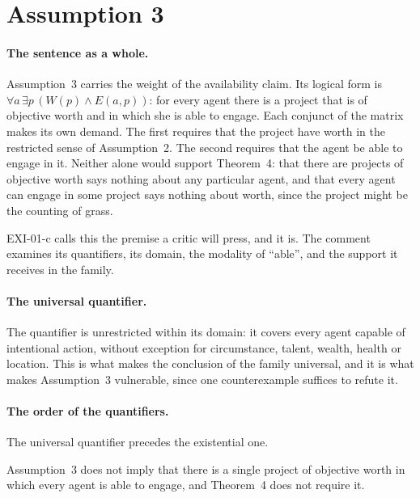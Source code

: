\section{Assumption 3}\label{s:ass3}


\paragraph{The sentence as a whole.} Assumption~3 carries the weight of the availability claim. Its logical form is $\forall a\,\exists p\,(W(p) \wedge E(a,p))$: for every agent there is a project that is of objective worth and in which she is able to engage. Each conjunct of the matrix makes its own demand. The first requires that the project have worth in the restricted sense of Assumption~2. The second requires that the agent be able to engage in it. Neither alone would support Theorem~4: that there are projects of objective worth says nothing about any particular agent, and that every agent can engage in some project says nothing about worth, since the project might be the counting of grass.

EXI-01-c calls this the premise a critic will press, and it is. The comment examines its quantifiers, its domain, the modality of \enquote{able}, and the support it receives in the family.


\paragraph{The universal quantifier.} The quantifier is unrestricted within its domain: it covers every agent capable of intentional action, without exception for circumstance, talent, wealth, health or location. This is what makes the conclusion of the family universal, and it is what makes Assumption~3 vulnerable, since one counterexample suffices to refute it.

\paragraph{The order of the quantifiers.} The universal quantifier precedes the existential one.

\begin{proposition}\label{p:order}
Assumption~3 does not imply that there is a single project of objective worth in which every agent is able to engage, and Theorem~4 does not require it.
\end{proposition}

